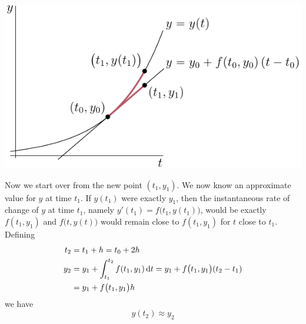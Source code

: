 \begin{efig}
\begin{center}
    \includegraphics{eulerIntro.pdf}
\end{center}
\end{efig}

Now we start over from the new point $(t_1,y_1)$. We now know an approximate value for $y$ at time $t_1$.
If $y(t_1)$ were exactly $y_1$, then the instantaneous rate of change of 
$y$ at time $t_1$, namely $y'(t_1)=f\big(t_1,y(t_1)\big)$, would be exactly 
$f(t_1,y_1)$ and  $f\big(t,y(t)\big)$ would remain close to $f(t_1,y_1)$
for $t$ close to $t_1$. Defining
\begin{align*}
t_2&=t_1+h=t_0+2h \\
y_2&=y_1 + \int_{t_1}^{t_2} f(t_1,y_1)\,\mathrm{d}t
   =y_1+f\big(t_1,y_1\big)(t_2-t_1) \\
  &=y_1+f\big(t_1,y_1\big)h
\end{align*}
we have 
\begin{equation*}
y(t_2)\approx y_2 
\end{equation*}



